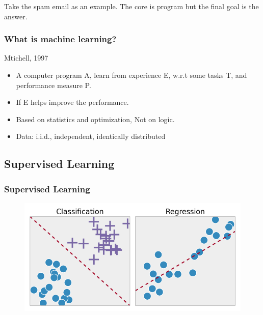 \documentclass[9pt]{beamer}
\begin{document}
\begin{CJK*}{GBK}{kai}
\begin{frame}
\begin{figure}[h]
\end{figure}
Take the spam email as an example. The core is program but the final goal is the answer.
\end{frame}
\begin{frame}
	\frametitle{What is machine learning?}
	\begin{block}{Mtichell, 1997}
		\begin{itemize}
			
			\item A computer program A, learn from experience E, 
			w.r.t some tasks T, and performance measure P.
			
			\item If E helps improve the performance.			
		\end{itemize}
	\end{block}
	
	\begin{itemize}
	\item Based on statistics and optimization, Not on logic.	
	\item Data: i.i.d., independent, identically distributed
	\end{itemize}
\end{frame}
\subsection{Supervised Learning}
\begin{frame}
\frametitle{Supervised Learning}
\begin{figure}[h]
	\centering
	\includegraphics[scale=0.3]{supervisedlearning.png}


\end{figure}
\end{frame}
\end{CJK*}
\end{document}
